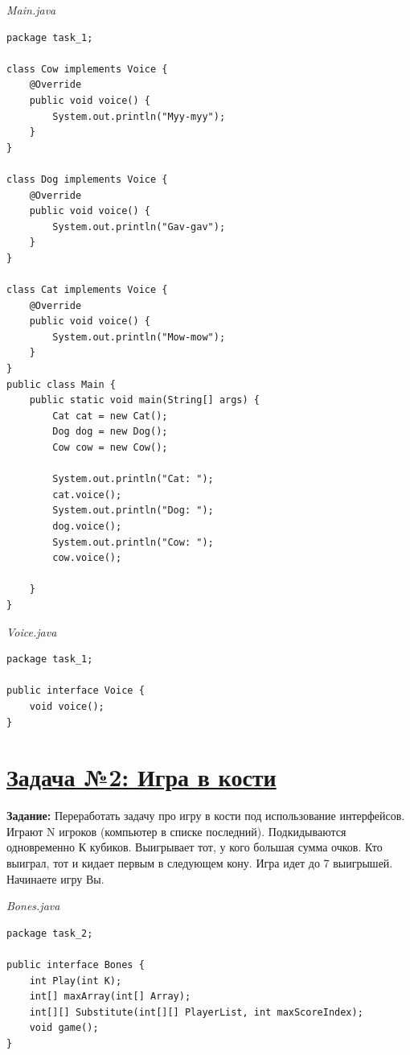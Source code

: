 \documentclass[a4paper]{article}
\begin{document}
\begin{minipage}{0.5\textwidth}
    \textit{Main.java}
    \begin{lstlisting}
package task_1;

class Cow implements Voice {
    @Override
    public void voice() {
        System.out.println("Myy-myy");
    }
}

class Dog implements Voice {
    @Override
    public void voice() {
        System.out.println("Gav-gav");
    }
}

class Cat implements Voice {
    @Override
    public void voice() {
        System.out.println("Mow-mow");
    }
}
public class Main {
    public static void main(String[] args) {
        Cat cat = new Cat();
        Dog dog = new Dog();
        Cow cow = new Cow();

        System.out.println("Cat: ");
        cat.voice();
        System.out.println("Dog: ");
        dog.voice();
        System.out.println("Cow: ");
        cow.voice();

    }
}   
        \end{lstlisting}
\end{minipage}
\hfill
\begin{minipage}{0.5\textwidth}
        \textit{Voice.java}
        \begin{lstlisting}
package task_1;

public interface Voice {
    void voice();
}
        \end{lstlisting}
\end{minipage}





\section{\href{https://github.com/yarvod/NetCracker_LearningCenter/tree/main/Practise_tasks/Practice_task_1}{Задача №2: Игра в кости}}

\textbf{Задание:} Переработать задачу про игру в кости под использование интерфейсов.
Играют N игроков (компьютер в списке последний). Подкидываются одновременно К кубиков. Выигрывает тот, у кого большая сумма очков. Кто выиграл, тот и кидает первым в следующем кону. Игра идет до 7 выигрышей. Начинаете игру Вы. \par 

\textit{Bones.java}
\begin{lstlisting}
package task_2;

public interface Bones {
    int Play(int K);
    int[] maxArray(int[] Array);
    int[][] Substitute(int[][] PlayerList, int maxScoreIndex);
    void game();
}
\end{lstlisting}
\end{document}
